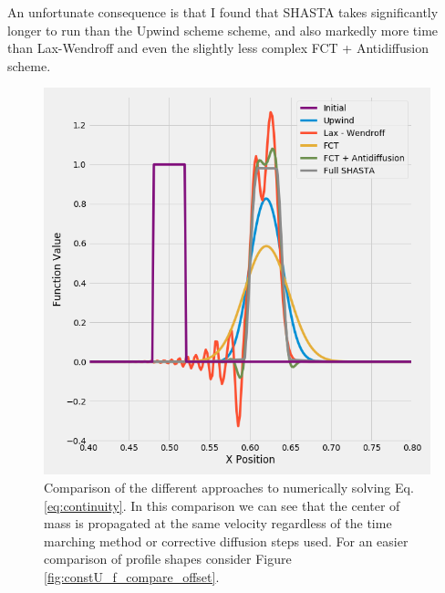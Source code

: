 \documentclass[]{article}
\begin{document}
An unfortunate consequence is that I found that SHASTA takes significantly longer to run than the Upwind scheme scheme, and also markedly more time than Lax-Wendroff and even the slightly less complex FCT + Antidiffusion scheme. 


\begin{figure}
		\centering
		\includegraphics[width=.8\linewidth]{figures/constU_fCompare.png}

	\caption{Comparison of the different approaches to numerically solving Eq. \ref{eq:continuity}. In this comparison we can see that the center of mass is propagated at the same velocity regardless of the time marching method or corrective diffusion steps used. For an easier comparison of profile shapes consider Figure \ref{fig:constU_f_compare_offset}. }
	\label{fig:constU_f_compare}
\end{figure}
\end{document}
